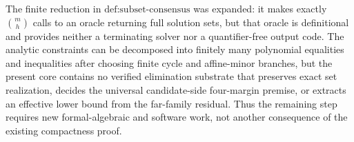 The finite reduction in \(\text{def:subset-consensus}\) was expanded: it makes exactly \(\binom{m}{h}\) calls to an oracle returning full solution sets, but that oracle is definitional and provides neither a terminating solver nor a quantifier-free output code. The analytic constraints can be decomposed into finitely many polynomial equalities and inequalities after choosing finite cycle and affine-minor branches, but the present core contains no verified elimination substrate that preserves exact set realization, decides the universal candidate-side four-margin premise, or extracts an effective lower bound from the far-family residual. Thus the remaining step requires new formal-algebraic and software work, not another consequence of the existing compactness proof.